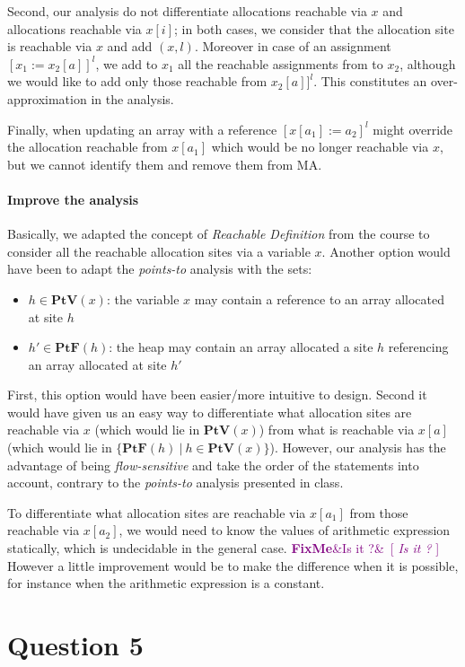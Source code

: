 \documentclass{article}
\newcommand{\fixme}[1]{\textcolor{purple}{\textbf{FixMe}\ifx&#1&\else ~[ \emph{#1} ]~\fi}}
\begin{document}
Second, our analysis do not differentiate allocations reachable via \(x\) and allocations reachable via \(x[i]\); in both cases, we consider that the allocation site is reachable via \(x\) and add \((x,l)\).
Moreover in case of an assignment \([x_1 := x_2[a]]^l\), we add to \(x_1\) all the reachable assignments from to \(x_2\), although we would like to add only those reachable from \(x_2[a]]^l\).
This constitutes an over-approximation in the analysis.

Finally, when updating an array with a reference \([x[a_1] := a_2]^l\) might override the allocation reachable from \(x[a_1]\) which would be no longer reachable via \(x\), but we cannot identify them and remove them from MA.


\paragraph{Improve the analysis}
Basically, we adapted the concept of {\em Reachable Definition} from the course to consider all the reachable allocation sites via a variable \(x\). Another option would have been to adapt the {\em points-to} analysis with the sets:
\begin{itemize}
 \item \(h \in \textbf{PtV}(x)\): the variable \(x\) may contain a reference to an array allocated at site \(h\)
 \item \(h' \in \textbf{PtF}(h)\): the heap may contain an array allocated a site \(h\) referencing an array allocated at site \(h'\)
\end{itemize}
First, this option would have been easier/more intuitive to design.
Second it would have given us an easy way to differentiate what allocation sites are reachable via \(x\) (which would lie in \(\textbf{PtV}(x)\)) from what is reachable via \(x[a]\) (which would lie in \(\{\textbf{PtF}(h)\ |\ h \in \textbf{PtV}(x)\}\)).
However, our analysis has the advantage of being {\em flow-sensitive} and take the order of the statements into account, contrary to the {\em points-to} analysis presented in class.

To differentiate what allocation sites are reachable via \(x[a_1]\) from those reachable via \(x[a_2]\), we would need to know the values of arithmetic expression statically, which is undecidable in the general case. \fixme{Is it ?} However a little improvement would be to make the difference when it is possible, for instance when the arithmetic expression is a constant.

\section*{Question 5}
\end{document}
